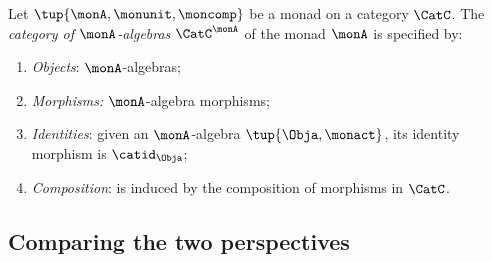 \begin{ctdefinition}
	\label{def:catofmonadalgebras}
	Let $\tup{\monA, \monunit, \moncomp}$ be a monad on a category $\CatC$.
	The \emph{category of $\monA$-algebras} $\CatC^\monA$ of the monad $\monA$ is specified by:
	\begin{enumerate}
		\item \emph{Objects}: $\monA$-algebras;
		\item \emph{Morphisms:} $\monA$-algebra morphisms;
		\item \emph{Identities}: given an $\monA$-algebra $\tup{\Obja, \monact}$, its identity morphism is $\catid_\Obja$;
		\item \emph{Composition}: is induced by the composition of morphisms in $\CatC$.
	\end{enumerate}
\end{ctdefinition}

\subsection{Comparing the two perspectives}


